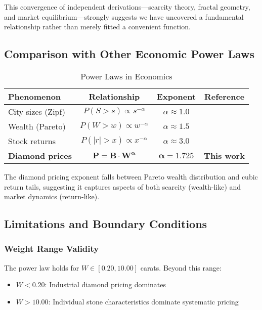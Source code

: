 \documentclass[12pt,a4paper]{article}
\theoremstyle{definition}
\theoremstyle{remark}
\begin{document}
This convergence of independent derivations—scarcity theory, fractal geometry, and market equilibrium—strongly suggests we have uncovered a fundamental relationship rather than merely fitted a convenient function.

\subsection{Comparison with Other Economic Power Laws}

\begin{table}[H]
\centering
\caption{Power Laws in Economics}
\label{tab:power_laws}
\begin{tabular}{@{}lccc@{}}
\toprule
\textbf{Phenomenon} & \textbf{Relationship} & \textbf{Exponent} & \textbf{Reference} \\
\midrule
City sizes (Zipf) & $P(S > s) \propto s^{-\alpha}$ & $\alpha \approx 1.0$ & \citet{gabaix1999zipf} \\
Wealth (Pareto) & $P(W > w) \propto w^{-\alpha}$ & $\alpha \approx 1.5$ & \citet{pareto1896} \\
Stock returns & $P(|r| > x) \propto x^{-\alpha}$ & $\alpha \approx 3.0$ & \citet{gopikrishnan1999scaling} \\

\textbf{Diamond prices} & $\mathbf{P = B \cdot W^{\alpha}}$ & $\boldsymbol{\alpha = 1.725}$ & \textbf{This work} \\
\bottomrule
\end{tabular}
\end{table}

The diamond pricing exponent falls between Pareto wealth distribution and cubic return tails, suggesting it captures aspects of both scarcity (wealth-like) and market dynamics (return-like).

\subsection{Limitations and Boundary Conditions}

\subsubsection{Weight Range Validity}
The power law holds for $W \in [0.20, 10.00]$ carats. Beyond this range:
\begin{itemize}
\item $W < 0.20$: Industrial diamond pricing dominates
\item $W > 10.00$: Individual stone characteristics dominate systematic pricing
\end{itemize}
\end{document}
